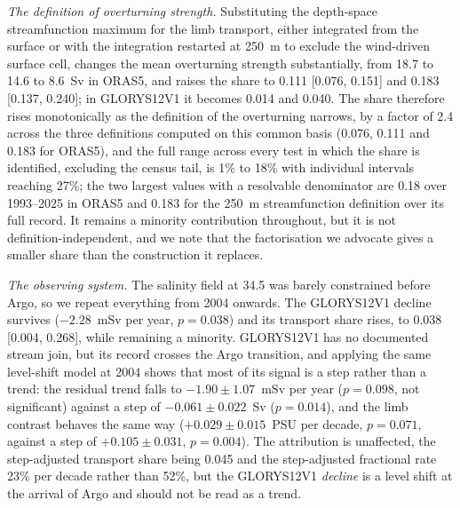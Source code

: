 \emph{The definition of overturning strength.} Substituting the depth-space
streamfunction maximum for the limb transport, either integrated from the
surface or with the integration restarted at 250~m to exclude the wind-driven
surface cell, changes the mean overturning strength substantially, from 18.7 to
14.6 to 8.6~Sv in ORAS5, and raises the share to 0.111 [0.076, 0.151] and 0.183
[0.137, 0.240]; in GLORYS12V1 it becomes 0.014 and 0.040. The share therefore
rises monotonically as the definition of the overturning narrows, by a factor of
2.4 across the three definitions computed on this common basis (0.076, 0.111 and
0.183 for ORAS5), and the full range across every test in which the share is
identified, excluding the census tail, is 1\% to 18\% with individual intervals
reaching 27\%; the two largest values with a resolvable denominator are
0.18 over 1993--2025 in ORAS5 and 0.183 for the 250~m streamfunction definition
over its full record. It remains a
minority contribution throughout, but it is not definition-independent, and we
note that the factorisation we advocate gives a smaller share than the
construction it replaces.

\emph{The observing system.} The salinity field at 34.5\degS{} was barely
constrained before Argo, so we repeat everything from 2004 onwards. The
GLORYS12V1 decline survives ($-2.28$~mSv per year, $p=0.038$) and its transport
share rises, to 0.038 [0.004, 0.268], while remaining a minority. GLORYS12V1 has no documented stream join, but its record
crosses the Argo transition, and applying the same level-shift model at 2004
shows that most of its signal is a step rather than a trend: the residual trend
falls to $-1.90\pm1.07$~mSv per year ($p=0.098$, not significant) against a step
of $-0.061\pm0.022$~Sv ($p=0.014$), and the limb contrast behaves the same way
($+0.029\pm0.015$~PSU per decade, $p=0.071$, against a step of
$+0.105\pm0.031$, $p=0.004$). The attribution is unaffected, the step-adjusted
transport share being 0.045 and the step-adjusted fractional rate 23\% per
decade rather than 52\%, but the GLORYS12V1 \emph{decline} is a level shift
at the arrival of Argo and should not be read as a trend.

